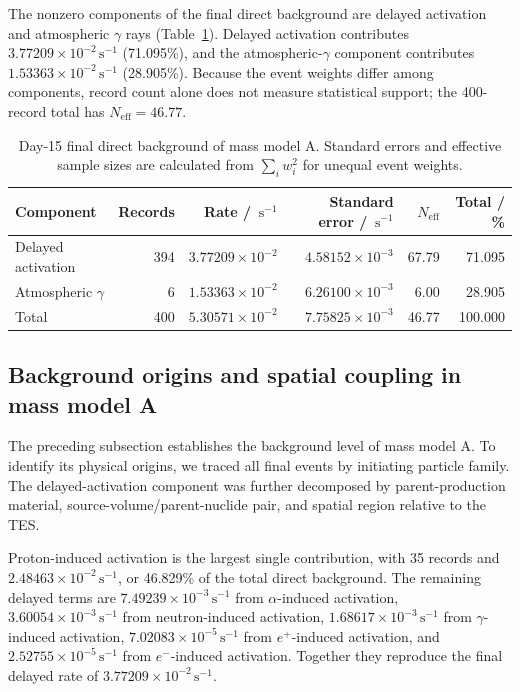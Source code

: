 \documentclass[11pt]{article}
\newcommand{\cps}{\ensuremath{\,\mathrm{s^{-1}}}}
\begin{document}
The nonzero components of the final direct background are delayed activation
and atmospheric $\gamma$ rays
(Table~\ref{tab:reference_background_budget}). Delayed activation contributes
$3.77209\times10^{-2}\cps$ (71.095\%), and the atmospheric-$\gamma$ component contributes
$1.53363\times10^{-2}\cps$ (28.905\%). Because the event weights differ among
components, record count alone does not measure statistical support; the
400-record total has $N_{\mathrm{eff}}=46.77$.

\begin{table}[H]
\centering
\caption{Day-15 final direct background of mass model A. Standard errors and effective sample sizes are calculated from $\sum_i w_i^2$ for unequal event weights.}
\label{tab:reference_background_budget}
\footnotesize
\begin{tabular}{lrrrrr}
\toprule
Component & Records & Rate / $\cps$ & Standard error / $\cps$ & $N_{\mathrm{eff}}$ & Total / \% \\
\midrule
Delayed activation & 394 & $3.77209\times10^{-2}$ & $4.58152\times10^{-3}$ & 67.79 & 71.095 \\
Atmospheric $\gamma$ & 6 & $1.53363\times10^{-2}$ & $6.26100\times10^{-3}$ & 6.00 & 28.905 \\
\midrule
Total & 400 & $5.30571\times10^{-2}$ & $7.75825\times10^{-3}$ & 46.77 & 100.000 \\
\bottomrule
\end{tabular}
\end{table}

\subsection{Background origins and spatial coupling in mass model A}
\label{subsec:mass_model_a_origins}



\begingroup

The preceding subsection establishes the background level of mass model A. To identify its physical origins, we traced all final events by initiating particle family. The delayed-activation component was further decomposed by parent-production material, source-volume/parent-nuclide pair, and spatial region relative to the TES.

Proton-induced activation is the largest single contribution, with 35 records and $2.48463\times10^{-2}\cps$, or 46.829\% of the total direct background. The remaining delayed terms are $7.49239\times10^{-3}\cps$ from $\alpha$-induced activation, $3.60054\times10^{-3}\cps$ from neutron-induced activation, $1.68617\times10^{-3}\cps$ from $\gamma$-induced activation, $7.02083\times10^{-5}\cps$ from $e^+$-induced activation, and $2.52755\times10^{-5}\cps$ from $e^-$-induced activation. Together they reproduce the final delayed rate of $3.77209\times10^{-2}\cps$.
\end{document}
